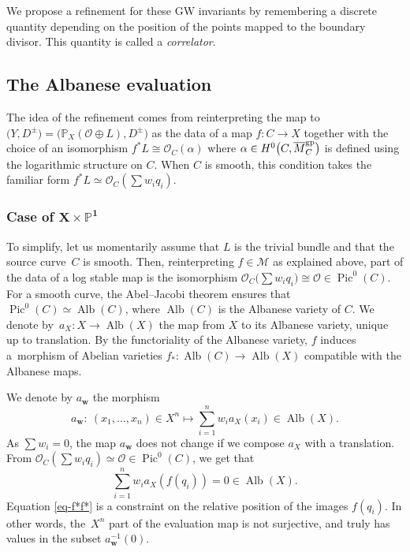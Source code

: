 \documentclass[11pt]{article}
\numberwithin{equation}{section}
\newcommand{\Pic}{\operatorname{Pic}}
\newcommand{\Alb}{\operatorname{Alb}}
\newcommand{\PP}{\mathbb{P}}
\newcommand{\bfw}{ {\boldsymbol w} }
\newcommand{\M}{\mathcal{M}}
\renewcommand{\O}{\mathcal{O}}
\renewcommand{\bar}{\overline}
\numberwithin{equation}{section}
\theoremstyle{definition}
\begin{document}
 We propose a refinement for these GW invariants by remembering a discrete quantity depending on the position of the points mapped to the boundary divisor. This quantity is called a \textit{correlator}.

\subsection{The Albanese evaluation}
The idea of the refinement comes from reinterpreting the map to $\bigl(Y, D^\pm\bigr)=\bigl(\PP_X(\O\oplus L), D^\pm\bigr)$ as the data of a map $f\colon C\to X$ together with the choice of an isomorphism $f^*L\cong\O_C(\alpha)$ where $\alpha\in H^0\bigl(C,\bar{M}_C^{\rm gp}\bigr)$ is defined using the logarithmic structure on $C$. When $C$ is smooth, this condition takes the familiar form $f^*L\simeq\O_C(\sum w_i q_i)$.

\subsubsection[Case of X times P\^{}1]{Case of $\boldsymbol{ X\times\PP^1}$}


To simplify, let us momentarily assume that $L$ is the trivial bundle and that the source curve~$C$ is smooth.
 Then, reinterpreting $f\in\M$ as explained above, part of the data of a log stable map is the isomorphism
$
\O_C\bigl(\sum w_iq_i\bigr)\cong\O\in\Pic^0(C)$.
For a smooth curve, the Abel--Jacobi theorem ensures that $\Pic^0(C)\simeq\Alb(C)$, where $\Alb(C)$ is the Albanese variety of $C$.
 We denote by~${a_X\colon X\to\Alb(X)}$ the map from $X$ to its Albanese variety, unique up to translation. By the functoriality of the Albanese variety, $f$ induces a~morphism of Abelian varieties
$
 f_*\colon \Alb(C)\to\Alb(X)
$ compatible with the Albanese maps.

We denote by $a_\bfw$ the morphism
\[
 a_\bfw\colon\ (x_1,\dots,x_n)\in X^n\longmapsto \sum_{i=1}^n w_i a_X(x_i)\in\Alb(X).
 \]
As $\sum w_i=0$, the map $a_\bfw$ does not change if we compose $a_X$ with a translation. From $\O_C(\sum w_iq_i)\simeq\O\in\Pic^0(C)$, we get that
\begin{equation}\label{eq-f*f*}
 \sum_{i=1}^n w_i a_X(f(q_i)) =0\in\Alb(X).
\end{equation}
Equation \eqref{eq-f*f*} is a constraint on the relative position of the images $f(q_i)$. In other words, the~$X^n$ part of the evaluation map is not surjective, and truly has values in the subset $a_\bfw^{-1}(0)$.
\end{document}

